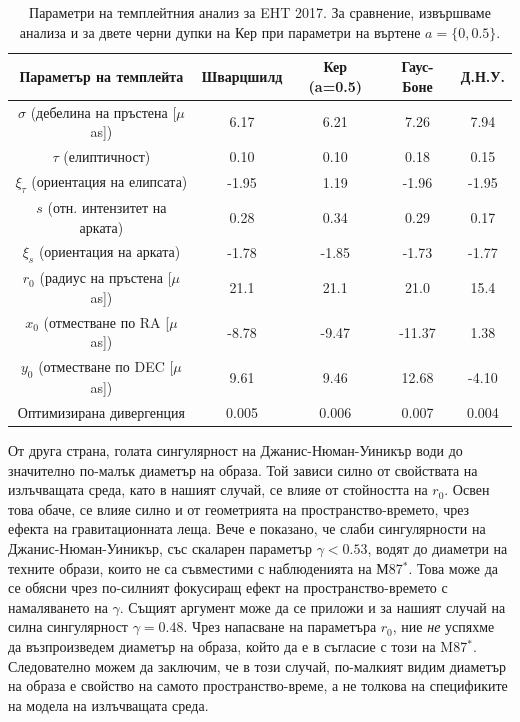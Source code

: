 \begin{table}[h!]
	\centering
	\begin{tabular}{c|c|c|c|c}
		\hline
		{Параметър на темплейта} & {Шварцшилд}&{Кер (a=0.5)}&{Гаус-Боне}&{Д.Н.У.}
		\\\hline\hline
		$\sigma$ {(\small дебелина на пръстена [$\mu$as])} & 6.17&6.21&7.26&7.94
		\\
		$\tau$ {(\small елиптичност)} & 0.10&0.10&0.18&0.15
		\\
		$\xi_\tau$ {(\small ориентация на елипсата)} & -1.95&1.19&-1.96&-1.95
		\\
		$s$ {(\small отн. интензитет на арката)} & 0.28 &0.34 & 0.29 & 0.17
		\\
		$\xi_s$ {(\small ориентация на арката)} & -1.78 &-1.85 &-1.73 & -1.77
		\\\hline
		$r_0$ {(\small радиус на пръстена [$\mu$as])} & 21.1 &21.1&21.0 & 15.4
		\\
		$x_0$ {(\small отместване по RA [$\mu$as])} & -8.78 &-9.47&-11.37 & 1.38
		\\
		$y_0$ {(\small отместване по DEC [$\mu$as])} & 9.61 & 9.46&12.68&-4.10
		\\\hline\hline
		{Оптимизирана дивергенция} & 0.005 & 0.006&  0.007 & 0.004
		\\ \hline
	\end{tabular}
	\caption[Параметри на темплейтния анализ за EHT 2017.]{\small Параметри на темплейтния анализ за EHT 2017. За сравнение, извършваме анализа и за двете черни дупки на Кер при параметри на въртене $a =\{0,0.5\}$.}
	\label{table:VIDA_2017}
\end{table}

От друга страна, голата сингулярност на Джанис-Нюман-Уиникър води до значително по-малък диаметър на образа. Той зависи силно от свойствата на излъчващата среда, като в нашият случай, се влияе от стойността на $r_0$. Освен това обаче, се влияе силно и от геометрията на пространство-времето, чрез ефекта на гравитационната леща. Вече е показано, че слаби сингулярности на Джанис-Нюман-Уиникър, със скаларен параметър $\gamma <0.53$, водят до диаметри на техните образи, които не са съвместими с наблюденията на М87$^*$. Това може да се обясни чрез по-силният фокусиращ ефект на пространство-времето с намаляването на $\gamma$. Същият аргумент може да се приложи и за нашият случай на силна сингулярност $\gamma = 0.48$. Чрез напасване на параметъра $r_0$, ние \emph{не} успяхме да възпроизведем диаметър на образа, който да е в съгласие с този на M87$^*$. Следователно можем да заключим, че в този случай, по-малкият видим диаметър на образа е свойство на самото пространство-време, а не толкова на спецификите на модела на излъчващата среда.\\

